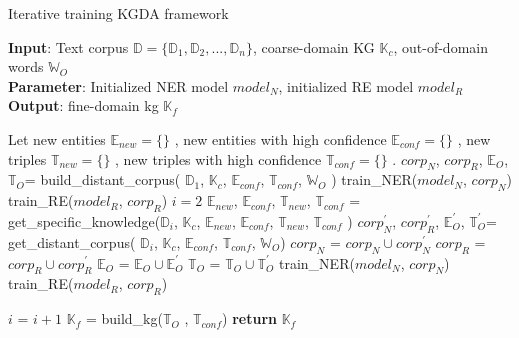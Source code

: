 \documentclass[sigconf]{acmart}
\begin{document}
\begin{algorithm}[tb]
	\caption{Iterative training KGDA framework}
	\label{alg:algorithm1}
	\textbf{Input}: Text corpus $\mathbb{D} = \{\mathbb{D}_1,\mathbb{D}_2,...,\mathbb{D}_n\}$, coarse-domain KG $\mathbb{K}_c$, out-of-domain words $\mathbb{W}_O$ \\
	\textbf{Parameter}: Initialized NER model $model_N$, initialized RE model $model_R$ \\
	\textbf{Output}:  fine-domain kg $\mathbb{K}_f$
	\begin{algorithmic}[1] %
		\STATE Let new entities  $\mathbb{E}_{new}=\{\}$ , new entities  with high confidence $\mathbb{E}_{conf}=\{\}$ , new triples  $\mathbb{T}_{new}=\{\}$ , new triples  with high confidence $\mathbb{T}_{conf}=\{\}$ .
		\STATE $corp_N$, $corp_R$, $\mathbb{E}_O$, $\mathbb{T}_O$= build\_distant\_corpus( $\mathbb{D}_1$, $\mathbb{K}_c$, $\mathbb{E}_{conf}$, $\mathbb{T}_{conf}$, $\mathbb{W}_O$ )
		\STATE train\_NER($model_N$,  $corp_N$)
		\STATE train\_RE($model_R$,  $corp_R$)
		\STATE $i = 2 $
		\STATE $\mathbb{E}_{new}$, $\mathbb{E}_{conf}$, $\mathbb{T}_{new}$, $\mathbb{T}_{conf}$ = get\_specific\_knowledge($\mathbb{D}_i$, $\mathbb{K}_c$, $\mathbb{E}_{new}$, $\mathbb{E}_{conf}$, $\mathbb{T}_{new}$, $\mathbb{T}_{conf}$ )
		\STATE $corp_N^{'}$, $corp_R^{'}$, $\mathbb{E}_O^{'}$, $\mathbb{T}_O^{'}$= get\_distant\_corpus( $\mathbb{D}_i$, $\mathbb{K}_c$, $\mathbb{E}_{conf}$, $\mathbb{T}_{conf}$, $\mathbb{W}_O$)
		\STATE $corp_N$ = $corp_N \cup corp_N^{'}$
		\STATE $corp_R$ = $corp_R \cup corp_R^{'}$
		\STATE$\mathbb{E}_O$ = $\mathbb{E}_O \cup \mathbb{E}_O^{'}$
		\STATE$\mathbb{T}_O$ = $\mathbb{T}_O \cup \mathbb{T}_O^{'}$
		\STATE train\_NER($model_N$,  $corp_N$)
		\STATE train\_RE($model_R$,  $corp_R$)
		
		\STATE $i$ = $i + 1 $
		\ENDWHILE
		\STATE $\mathbb{K}_f$ = build\_kg($\mathbb{T}_{O}$ , $\mathbb{T}_{conf}$)
		\STATE \textbf{return} $\mathbb{K}_f$
	\end{algorithmic}
\end{algorithm}
\end{document}
